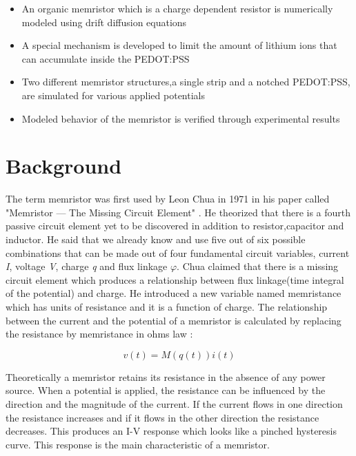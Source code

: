 \begin{doublespace}
\begin{itemize}
  \item An organic memristor which is a charge dependent resistor is numerically modeled using drift diffusion equations  
  \item A special mechanism is developed to limit the amount of lithium ions that can accumulate inside the PEDOT:PSS
  \item Two different memristor structures,a single strip and a notched PEDOT:PSS, are simulated for various applied potentials
  \item Modeled behavior of the memristor is verified through experimental results 
\end{itemize}

\section{Background}
The term memristor was first used by Leon Chua in 1971 in his paper called  "Memristor — The Missing Circuit Element" \cite{chua}. He theorized that there is a fourth passive circuit element yet to be discovered in addition to resistor,capacitor and inductor. He said that we already know and use five out of six possible combinations that can be made out of four fundamental circuit variables, current \textit{I}, voltage \textit{V}, charge \textit{q} and flux linkage \textit{$\varphi$}. Chua claimed that there is a missing circuit element which produces a relationship between flux linkage(time integral of the potential) and charge. He introduced a new variable named memristance which has units of resistance and it is a function of charge. The relationship between the current and the potential of a memristor is calculated by replacing the resistance by memristance in ohms law \cite{memristance}:


\begin{equation}
v(t)=M(q(t))i(t)
\end{equation}

Theoretically a memristor retains its resistance in the absence of any power source. When a potential is applied, the resistance can be influenced by the direction and the magnitude of the current. If the current flows in one direction the resistance increases and if it flows in the other direction the resistance decreases. This produces an I-V response which looks like a pinched hysteresis curve. This response is the main characteristic of a memristor. 


\end{doublespace}
